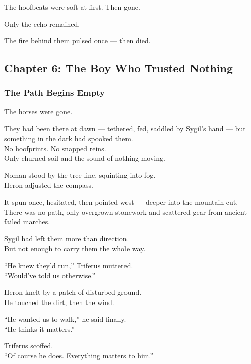 \documentclass[12pt]{article}
\begin{document}
The hoofbeats were soft at first. Then gone.

Only the echo remained.

The fire behind them pulsed once — then died.

\newpage

\subsection{Chapter 6: The Boy Who Trusted Nothing}

\vspace{.5in}

\subsubsection{The Path Begins Empty}

The horses were gone.

They had been there at dawn — tethered, fed, saddled by Sygil’s hand — but something in the dark had spooked them.\\
No hoofprints. No snapped reins.\\
Only churned soil and the sound of nothing moving.

\vspace{1em}

Noman stood by the tree line, squinting into fog.\\
Heron adjusted the compass.

It spun once, hesitated, then pointed west — deeper into the mountain cut.\\
There was no path, only overgrown stonework and scattered gear from ancient failed marches.

Sygil had left them more than direction.\\
But not enough to carry them the whole way.

\vspace{1em}

“He knew they’d run,” Triferus muttered.\\
“Would’ve told us otherwise.”

Heron knelt by a patch of disturbed ground.\\
He touched the dirt, then the wind.

“He wanted us to walk,” he said finally.\\
“He thinks it matters.”

\vspace{1em}

Triferus scoffed.\\
“Of course he does. Everything matters to him.”
\end{document}
